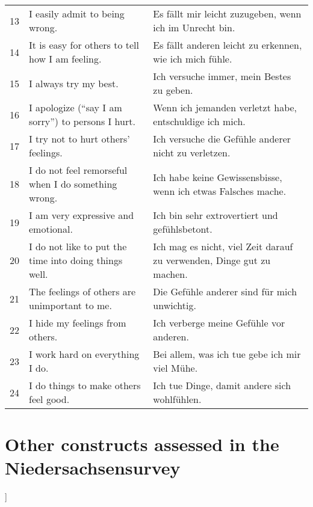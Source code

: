 \begin{table}[]
\begin{tabular}{lll}
13 & I easily admit to being wrong. 													& Es fällt mir leicht zuzugeben, wenn ich im Unrecht bin. \\
14 & It is easy for others to tell how I am feeling. 									& Es fällt anderen leicht zu erkennen, wie ich mich fühle. \\
15 & I always try my best. 															& Ich versuche immer, mein Bestes zu geben. \\
16 & I apologize (“say I am sorry”) to persons I hurt. 								& Wenn ich jemanden verletzt habe, entschuldige ich mich. \\
17 & I try not to hurt others’ feelings. 												& Ich versuche die Gefühle anderer nicht zu verletzen. \\
18 & I do not feel remorseful when I do something wrong. 								& Ich habe keine Gewissensbisse, wenn ich etwas Falsches mache. \\
19 & I am very expressive and emotional. 												& Ich bin sehr extrovertiert und gefühlsbetont. \\
20 & I do not like to put the time into doing things well. 							& Ich mag es nicht, viel Zeit darauf zu verwenden, Dinge gut zu machen. \\
21 & The feelings of others are unimportant to me. 									& Die Gefühle anderer sind für mich unwichtig. \\
22 & I hide my feelings from others. 													& Ich verberge meine Gefühle vor anderen. \\
23 & I work hard on everything I do. 													& Bei allem, was ich tue gebe ich mir viel Mühe. \\
24 & I do things to make others feel good. 											& Ich tue Dinge, damit andere sich wohlfühlen.
\end{tabular}
\end{table}

\section{Other constructs assessed in the Niedersachsensurvey}]

